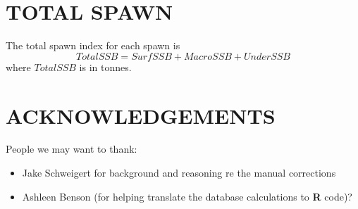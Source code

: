 \documentclass[12pt]{article}
\begin{document}
\section{TOTAL SPAWN}

The total spawn index for each spawn is
\begin{equation}
TotalSSB = SurfSSB + MacroSSB + UnderSSB
\label{eqTotalSSB}
\end{equation}
where $TotalSSB$ is in tonnes.

\section{ACKNOWLEDGEMENTS}

People we may want to thank:
\begin{itemize}
\item Jake Schweigert for background and reasoning re the manual corrections
\item Ashleen Benson (for helping translate the database calculations to \textbf{R} code)?
\end{itemize}



\end{document}
